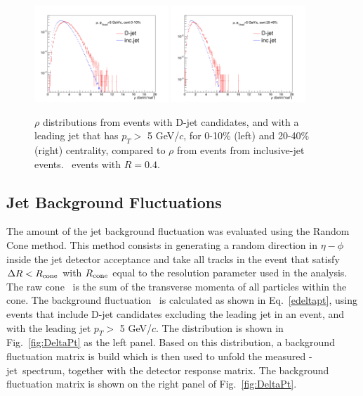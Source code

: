 \begin{figure}[bth]
\centering
\includegraphics[width=0.45\textwidth]{pPbplots/ResponseMatrix/hRho_ptleadbin5_cent0_10}
\includegraphics[width=0.45\textwidth]{pPbplots/ResponseMatrix/hRho_ptleadbin5_cent20_40}
\caption{$\rho$ distributions from events with D-jet candidates, and with a leading jet that has $p_{T}>$ 5 GeV/$c$, for 0-10\% (left) and 20-40\% (right) centrality, compared to $\rho$ from events from inclusive-jet events. \pPb\ events with $R=0.4$.}
\label{fig:rho}
\end{figure}

\subsection{Jet Background Fluctuations}
\label{sBackFluc}
The amount of the jet background fluctuation was evaluated using the Random Cone method.
This method consists in generating a random direction in $\eta-\phi$ inside the jet detector acceptance and 
take all tracks in the event that satisfy $\Delta R<R_{\rm cone}$ with $R_{\rm cone}$ equal to the resolution parameter used in the analysis. 
The raw cone \pt\ is the sum of the transverse momenta of all particles within the cone.
The background fluctuation \deltapt\ is calculated as shown in Eq.~\ref{edeltapt}, using events that include D-jet candidates excluding the leading jet in an event, and with the leading jet $p_{T}>$ 5 GeV/$c$. The distribution is shown in Fig.~\ref{fig:DeltaPt} as the left panel. Based on this distribution, a background fluctuation matrix is build which is then used to unfold the measured \Dstar-jet\ \pt spectrum, together with the detector response matrix. The background fluctuation matrix is shown on the right panel of Fig.~\ref{fig:DeltaPt}.


